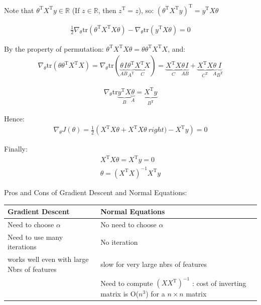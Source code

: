 \documentclass[a4paper,12pt]{report}
\begin{document}
Note that $\theta^{\mathrm{T}} X^{\mathrm{T}} y \in \mathbb{R}$ (If $z \in \mathbb{R}$, then $z^{\mathrm{T}} = z$), so: $(\theta^{\mathrm{T}} X^{\mathrm{T}} y)^{\mathrm{T}}= y^{\mathrm{T}} X \theta$ 

\begin{align*}
	 \frac{1}{2}\nabla_{\theta} \mathrm{tr} \left( \theta^{\mathrm{T}} X^{\mathrm{T}} X \theta \right) - \nabla_{\theta} \mathrm{tr} \left(  y^{\mathrm{T}} X \theta \right ) = 0
\end{align*}

By the property of permutation: $\theta^{\mathrm{T}} X^{\mathrm{T}} X \theta =  \theta \theta^{\mathrm{T}} X^{\mathrm{T}} X $, and: 
\begin{align*}
\nabla_{\theta} \mathrm{tr}(\theta \theta^{\mathrm{T}} X^{\mathrm{T}} X)
= \nabla_{\theta} \mathrm{tr} (\underbrace{\theta}_{A}  \underbrace{I}_{B} \underbrace{\theta^{\mathrm{T}}}_{A^{\mathrm{T}}} \underbrace{X^{\mathrm{T}} X}_{C})
= \underbrace{X^{\mathrm{T}}X}_{C} \underbrace{\theta}_{A} \underbrace{I}_{B} + \underbrace{X^{\mathrm{T}}X}_{C^{\mathrm{T}}} \underbrace{\theta}_{A} \underbrace{I}_{B^{\mathrm{T}}}
\end{align*}


\begin{align*}
\nabla _{\theta} \mathrm{tr} \underbrace{y^{\mathrm{T}} X}_{B} \underbrace{\theta}_{A} = \underbrace{X^{\mathrm{T}} y}_{B^{\mathrm{T}}}  
\end{align*}

Hence:
\begin{align*}
\nabla_{\theta} J(\theta) = \frac{1}{2} \left(X^{\mathrm{T}} X \theta + X^{\mathrm{T}} X \theta\ right) - X^{\mathrm{T}} y \right) = 0 
\end{align*}

Finally:
\begin{align*}
X^{\mathrm{T}} X \theta  = X^{\mathrm{T}} y = 0 \\
\theta = \left(X^{\mathrm{T}} X\right)^{-1} X^{\mathrm{T}} y
\end{align*}

Pros and Cons of Gradient Descent and Normal Equations: \\
\begin{tabular}{ | p{5cm} || p{5cm} |  }
\hline
 Gradient Descent & Normal Equations \\
 \hline
 Need to choose $\alpha$ & No need to choose $\alpha$ \\
 Need to use many iterations & No iteration \\
 works well even with large Nbrs of features & slow for very large nbrs of features \\
 & Need to compute $(XX^{\mathrm{T}})^{-1}$ : cost of inverting matrix is O($n^3$) for a $n \times n$ matrix\\
\end{tabular}
\end{document}
